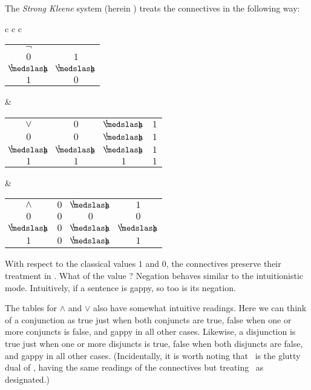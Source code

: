 	The \emph{Strong Kleene} system (herein \Kthree) treats the connectives in the following way:
\begin{singlespace}	
	\begin{longtable}{c c c}
	 	\begin{tabular}{c | c}
			$\neg$ 	&  			\\
			\cline{1-2} 
			$0$			& 	$1$ 		\\ 
			$\oneHalf$	& 	$\oneHalf$	\\
			$1$ 		& 	$0$ 		\\
		\end{tabular} 
		& 		
		\begin{tabular}{c | c c c}
			$\vee$ 		&	 $0$		& 	$\oneHalf$ 	& 	$1$ \\
			\cline{1-4} 
			$0$ 		& 	$0$ 		& 	$\oneHalf$ 	& 	$1$ \\
			$\oneHalf$ 	& 	$\oneHalf$ 	& 	$\oneHalf$ 	& 	$1$ \\
			$1$ 		& 	$1$ 		& 	$1$ 		& 	$1$ \\
		\end{tabular}
 		& 
		\begin{tabular}{c | c c c}
			$\wedge$ 	& 	$0$ 	& 	$\oneHalf$ 	& 	$1$ \\
			\cline{1-4} 
			$0$ 		& 	$0$ 	& 	$0$ 		& 	$0$ \\
			$\oneHalf$ 	& 	$0$ 	& 	$\oneHalf$ 	&	$\oneHalf$ \\
			$1$ 		& 	$0$ 	& 	$\oneHalf$ 	&	$1$ \\
		\end{tabular}
		
	\end{longtable}
\end{singlespace}	
	\noindent With respect to the classical values $1$ and $0$, the connectives preserve their treatment in \CPL. What of the value \oneHalf? Negation behaves similar to the intuitionistic mode. Intuitively, if a sentence is gappy, so too is its negation.
	
	The tables for $\wedge$ and $\vee$ also have somewhat intuitive readings. Here we can think of a conjunction as true just when both conjuncts are true, false when one or more conjuncts is false, and gappy in all other cases. Likewise, a disjunction is true just when one or more disjuncts is true, false when both disjuncts are false, and gappy in all other cases. (Incidentally, it is worth noting that \LP\ is the glutty dual of \Kthree, having the same readings of the connectives but treating \oneHalf\ as designated.)
		
